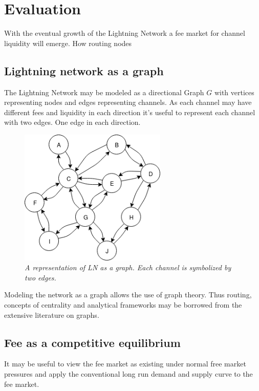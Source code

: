 \chapter{Evaluation}

With the eventual growth of the Lightning Network a fee market for channel liquidity will emerge. How routing nodes 

\section{Lightning network as a graph}

The Lightning Network may be modeled as a directional Graph $G$ with vertices representing nodes and edges representing channels. As each channel may have different fees and liquidity in each direction it's useful to represent each channel with two edges. One edge in each direction. 

\begin{figure}[!htb]
	\hspace*{-0.7cm} 
	\centering
	\includegraphics[width=7cm]{images/LN_overview.png}
	\caption{ \textit{A representation of LN as a graph. Each channel is symbolized by two edges.} 
	}
	\label{fig:ln:graph}
	\hspace*{2mm}
\end{figure}

Modeling the network as a graph allows the use of graph theory. Thus routing, concepts of centrality and analytical frameworks may be borrowed from the extensive literature on graphs. 

\section{Fee as a competitive equilibrium}

It may be useful to view the fee market as existing under normal free market pressures and apply the conventional long run demand and supply curve\cite{boulding:evolutionary:economy} to the fee market. 

